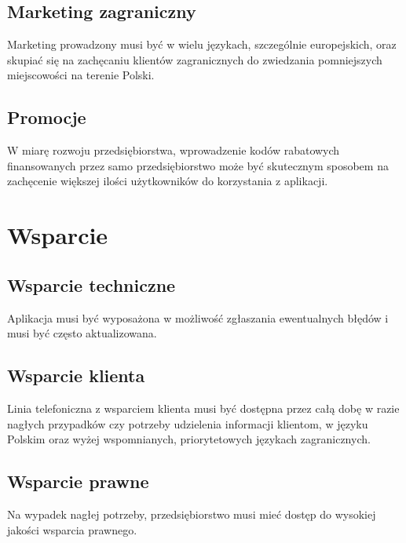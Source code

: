 \subsection{Marketing zagraniczny}
Marketing prowadzony musi być w wielu językach, szczególnie europejskich, oraz skupiać się na zachęcaniu klientów zagranicznych do zwiedzania pomniejszych miejscowości na terenie Polski.

\subsection{Promocje}
W miarę rozwoju przedsiębiorstwa, wprowadzenie kodów rabatowych finansowanych przez samo przedsiębiorstwo może być skutecznym sposobem na zachęcenie większej ilości użytkowników do korzystania z aplikacji.

\section{Wsparcie}
\subsection{Wsparcie techniczne}
Aplikacja musi być wyposażona w możliwość zgłaszania ewentualnych błędów i musi być często aktualizowana.

\subsection{Wsparcie klienta}
Linia telefoniczna z wsparciem klienta musi być dostępna przez całą dobę w razie nagłych przypadków czy potrzeby udzielenia informacji klientom, w języku Polskim oraz wyżej wspomnianych, priorytetowych językach zagranicznych.

\subsection{Wsparcie prawne}
Na wypadek nagłej potrzeby, przedsiębiorstwo musi mieć dostęp do wysokiej jakości wsparcia prawnego.